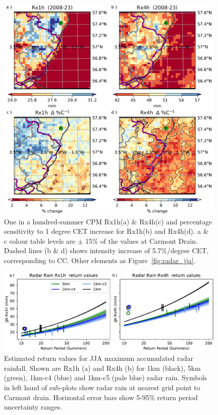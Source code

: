 \documentclass[11pt,a4paper]{article}
\begin{document}
\begin{figure}
	\centering
	\includegraphics[width=1\linewidth]{cpm_intensity_delta}
	\caption{One in a hundred-summer CPM Rx1h(a) \& Rx4h(c) and percentage sensitivity to 1 degree CET increase for Rx1h(b) and Rx4h(d).  a \& c colour table levels are $\pm$ 15\% of the values at Carmont Drain. Dashed lines (b \& d) shows intensity increase of 5.7\%/degree CET, corresponding to CC. Other elements as Figure~\ref{fig:radar_jja}.  }
	\label{fig:map_intensity}
\end{figure}

\begin{figure}
	\centering
	\includegraphics[width=\linewidth]{radar_return_prds}
	\caption{Estimated return values for  JJA maximum accumulated radar rainfall. Shown are Rx1h (a) and Rx4h (b) for 1km  (black),  5km (green), 1km-c4 (blue) and 1km-c5 (pale blue) radar rain. Symbols in left hand of sub-plots show radar rain at nearest grid point to Carmont drain. Horizontal error bars show 5-95\% return period uncertainty ranges. }
	\label{fig:radar_rtn_prd}
\end{figure}
\end{document}
